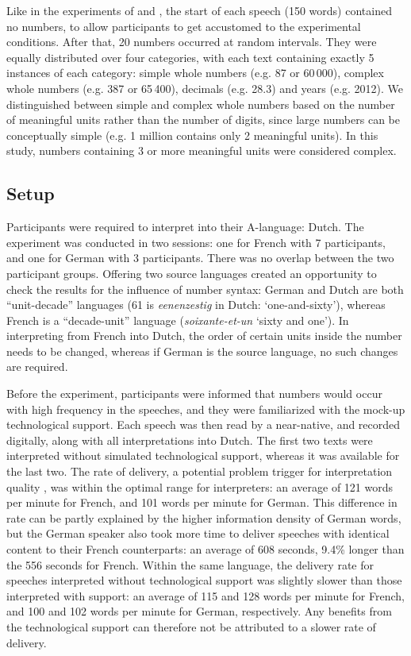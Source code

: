 \documentclass[output=paper]{langsci/langscibook}
\begin{document}
Like in the experiments of \citet{Braun1996} and \citet{Mazza2001}, the start of each speech (150 words) contained no numbers, to allow participants to get accustomed to the experimental conditions. After that, 20 numbers occurred at random intervals. They were equally distributed over four categories, with each text containing exactly 5 instances of each category: simple whole numbers (e.g. 87 or 60\,000), complex whole numbers (e.g. 387 or 65\,400), decimals (e.g. 28.3) and years (e.g. 2012). We distinguished between simple and complex whole numbers based on the number of meaningful units rather than the number of digits, since large numbers can be conceptually simple (e.g. 1 million contains only 2 meaningful units). In this study, numbers containing 3 or more meaningful units were considered complex.

\subsection{Setup}
Participants were required to interpret into their A-language: Dutch. The experiment was conducted in two sessions: one for French with 7 participants, and one for German with 3 participants. There was no overlap between the two participant groups. Offering two source languages created an opportunity to check the results for the influence of number syntax: German and Dutch are both “unit-decade” languages (61 is \textit{eenenzestig} in Dutch: ‘one-and-sixty’), whereas French is a “decade-unit” language (\textit{soixante-et-un} ‘sixty and one’). In interpreting from French into Dutch, the order of certain units inside the number needs to be changed, whereas if German is the source language, no such changes are required.

Before the experiment, participants were informed that numbers would occur with high frequency in the speeches, and they were familiarized with the mock-up technological support. Each speech was then read by a near-native, and recorded digitally, along with all interpretations into Dutch. The first two texts were interpreted without simulated technological support, whereas it was available for the last two. The rate of delivery, a potential problem trigger for interpretation quality \citep{Gile1995}, was within the optimal range for interpreters: an average of 121 words per minute for French, and 101 words per minute for German. This difference in rate can be partly explained by the higher information density of German words, but the German speaker also took more time to deliver speeches with identical content to their French counterparts: an average of 608 seconds, 9.4\% longer than the 556 seconds for French. Within the same language, the delivery rate for speeches interpreted without technological support was slightly slower than those interpreted with support: an average of 115 and 128 words per minute for French, and 100 and 102 words per minute for German, respectively. Any benefits from the technological support can therefore not be attributed to a slower rate of delivery.\largerpage
\end{document}
